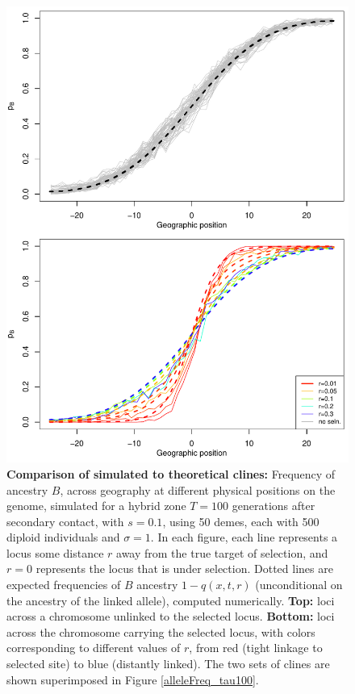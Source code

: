 \documentclass[11pt,letterpaper]{article}
\begin{document}
\begin{figure}
\includegraphics{figs/alleleFrequencies_sim_comparison_revision_original.pdf}
    \caption{
        \textbf{Comparison of simulated to theoretical clines:}
        Frequency of ancestry $B$,
        across geography at different physical positions on the genome, simulated for a hybrid zone
        $T=100$ generations after secondary contact, with $s=0.1$,
        using 50 demes, each with 500 diploid individuals and $\sigma=1$.
        In each figure,
        each line represents a locus some distance $r$ away from the true target of selection, 
        and $r=0$ represents the locus that is under selection. 
        Dotted lines are expected frequencies of $B$ ancestry $1-q(x,t,r)$
        (unconditional on the ancestry of the linked allele), computed numerically.
        \textbf{Top:}
        loci across a chromosome unlinked to the selected locus.
        \textbf{Bottom:}
        loci across the chromosome carrying the selected locus,
        with colors corresponding to different values of $r$, from red (tight linkage to selected site) to blue (distantly linked).
        The two sets of clines are shown superimposed in Figure \ref{alleleFreq_tau100}.
    }\label{fig:alleleFreq_tau100_comparison}
\end{figure}
\end{document}
